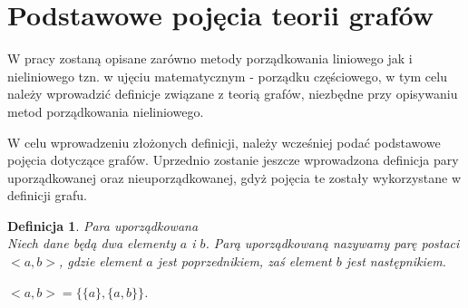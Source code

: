 \documentclass[12pt,a4paper]{report}
\newtheorem{definition}[theorem]{Definicja}
\begin{document}



\newpage
\section{Podstawowe pojęcia teorii grafów} %
\noindent

W pracy zostaną opisane zarówno metody porządkowania liniowego jak i nieliniowego tzn. w ujęciu matematycznym - porządku częściowego, w tym celu należy wprowadzić definicje związane z teorią grafów, niezbędne przy opisywaniu metod porządkowania nieliniowego.

W celu wprowadzeniu złożonych definicji, należy wcześniej podać podstawowe pojęcia dotyczące grafów. Uprzednio zostanie jeszcze wprowadzona definicja pary uporządkowanej oraz nieuporządkowanej, gdyż pojęcia te zostały wykorzystane w definicji grafu.



\begin{definition}{Para uporządkowana \cite[w oparciu o rozdział 3]{kuratowski2004}\\}
Niech dane będą dwa elementy $a$ i $b$. Parą uporządkowaną nazywamy parę postaci $<a,b>$, gdzie element $a$ jest poprzednikiem, zaś element $b$ jest następnikiem. 
\begin{center}
$<a,b>=\{\{a\},\{a,b\}\}$.
\end{center}
\end{definition}
\end{document}

